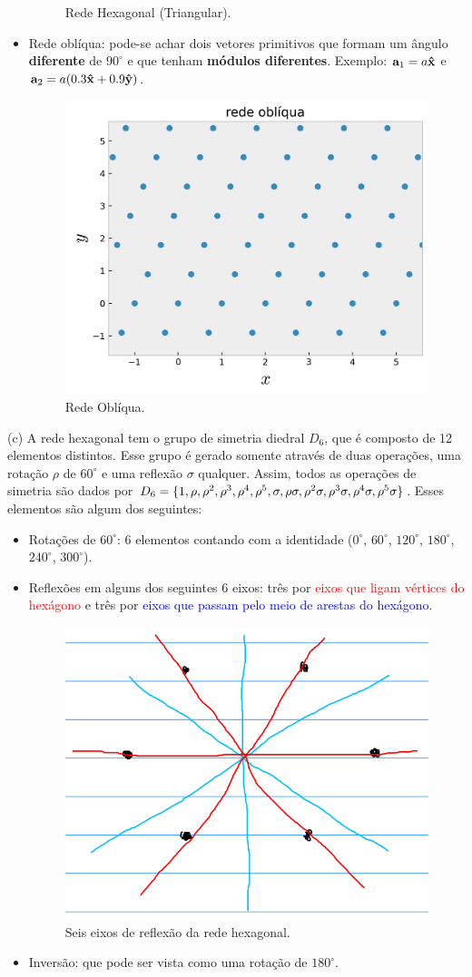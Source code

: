 \documentclass[a4paper,10pt]{article}
\begin{document}
\begin{itemize}
\begin{figure}[H]
\caption{Rede Hexagonal (Triangular).}
\label{fig:lat-triang}
\end{figure}
\item Rede oblíqua: pode-se achar dois vetores primitivos que formam um ângulo \textbf{diferente} de $90^\circ$ e que tenham \textbf{módulos diferentes}. Exemplo: $\vb{a}_1 = a \vu{x}$ e $\vb{a}_2 = a (0.3 \vu{x} + 0.9\vu{y})$.
\begin{figure}[H]
\centering
\includegraphics[width=0.6\linewidth]{fig/lattice_obliq.png}
\caption{Rede Oblíqua.}
\label{fig:lat-obliq}
\end{figure}
\end{itemize}

\n

(c) A rede hexagonal tem o grupo de simetria diedral $D_6$, que é composto de 12 elementos distintos. Esse grupo é gerado somente através de duas operações, uma rotação $\rho$ de $60^\circ$ e uma reflexão $\sigma$ qualquer. Assim, todos as operações de simetria são dados por $D_6 = \{1, \rho, \rho^2, \rho^3, \rho^4, \rho^5, \sigma, \rho\sigma, \rho^2\sigma, \rho^3\sigma, \rho^4\sigma, \rho^5\sigma\}$. Esses elementos são algum dos seguintes:
\begin{itemize}
\item Rotações de $60^\circ$: 6 elementos contando com a identidade ($0^\circ$, $60^\circ$, $120^\circ$, $180^\circ$, $240^\circ$, $300^\circ$).
\item Reflexões em alguns dos seguintes 6 eixos: três por \textcolor{red}{eixos que ligam vértices do hexágono} e três por \textcolor{blue}{eixos que passam pelo meio de arestas do hexágono}.
\begin{figure}[H]
\centering
\includegraphics[width=0.6\linewidth]{fig/hex_reflex.png}
\caption{Seis eixos de reflexão da rede hexagonal.}
\label{fig:hex_reflex}
\end{figure}
\item Inversão: que pode ser vista como uma rotação de $180^\circ$.
\end{itemize}
\end{document}
